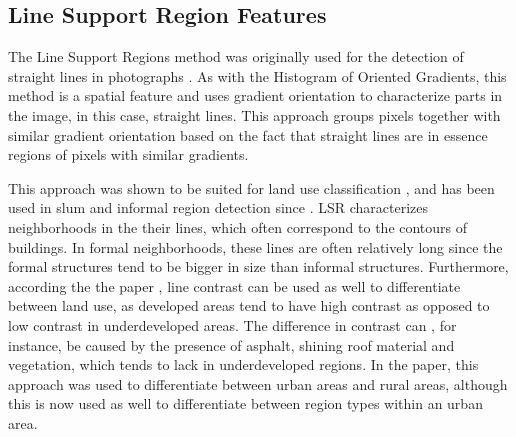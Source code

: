 %
%
%





\subsection{Line Support Region Features}

The Line Support Regions method was originally used for the detection of straight lines in photographs \cite{burns1986extracting}. As with the Histogram of Oriented Gradients, this method is a spatial feature and uses gradient orientation to characterize parts in the image, in this case, straight lines. This approach groups pixels together with similar gradient orientation based on the fact that straight lines are in essence regions of pixels with similar gradients. 

This approach was shown to be suited for land use classification \cite{unsalan2004classifying} \cite{unsalan2006gradient}, and has been used in slum and informal region detection since \cite{graesser2012image} \cite{accra} \cite{colombo}. LSR characterizes neighborhoods in the their lines, which often correspond to the contours of buildings. In formal neighborhoods, these lines are often relatively long since the formal structures tend to be bigger in size than informal structures. Furthermore, according the the paper \cite{unsalan2004classifying}, line contrast can be used as well to differentiate between land use, as developed areas tend to have high contrast as opposed to low contrast in underdeveloped areas. The difference in contrast can , for instance, be caused by the presence of asphalt, shining roof material and vegetation, which tends to lack in underdeveloped regions. In the paper, this approach was used to differentiate between urban areas and rural areas, although this is now used as well to differentiate between region types within an urban area.

